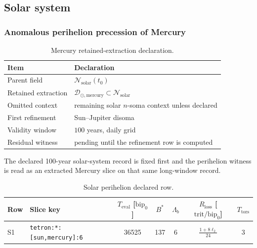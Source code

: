 \subsection{Solar system}

\subsubsection{Anomalous perihelion precession of Mercury}
\label{man:solar-perihelion-witness}

\begin{table}[H]
\centering
\caption{Mercury retained-extraction declaration.}
\label{tab:mercury-retention}
\begin{threeparttable}
\begin{tabularx}{\linewidth}{@{}lX@{}}
\toprule
Item & Declaration \\
\midrule
Parent field & \(\mathcal N_{\mathrm{solar}}(t_0)\) \\
Retained extraction & \(\mathcal D_{\odot,\mathrm{mercury}}\subset\mathcal N_{\mathrm{solar}}\) \\
Omitted context & remaining solar \(n\)-soma context unless declared \\
First refinement & Sun--Jupiter disoma \\
Validity window & \(100\) years, daily grid \\
Residual witness & pending until the refinement row is computed \\
\bottomrule
\end{tabularx}
\end{threeparttable}
\end{table}

The declared 100-year solar-system record is fixed first and the perihelion witness is read as an extracted Mercury slice on that same long-window record.

\begin{table}[H]
\centering
\caption{Solar perihelion declared row.}
\label{tab:solar-perihelion-row}
\begin{threeparttable}
\small
\begin{tabularx}{\linewidth}{@{}lXccccc@{}}
\toprule
Row & Slice key & $T_{\mathrm{eval}}$ [\(\mathrm{bip}_0\)] & $B^*$ & $\Lambda_b$ & $R_{\mathrm{loss}}$ [\(\mathrm{trit}/\mathrm{bip}_0\)] & $T_{\mathrm{tors}}$ \\
\midrule
S1 & \texttt{tetron:*:[sun,mercury]:6} & 36525 & 137 & 6 & $\frac{1+8\ell_2}{24}$ & 3 \\
\bottomrule
\end{tabularx}
\end{threeparttable}
\end{table}

